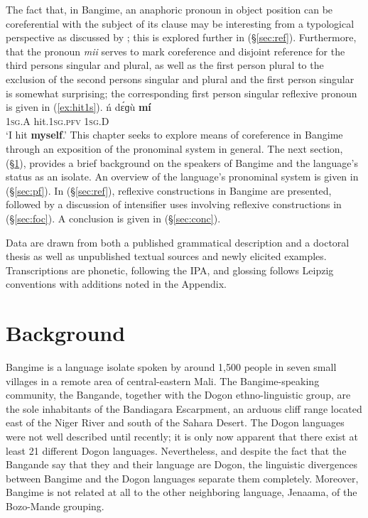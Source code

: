 \documentclass[output=paper]{langscibook}
\begin{document}
The fact that, in Bangime, an anaphoric pronoun in object position can be coreferential with the subject of its clause may be interesting from a typological perspective as discussed by \cite[4]{Haspelmath2019}; this is explored further in (\S \ref{sec:ref}). Furthermore, that the pronoun \textit{mii} serves to mark coreference and disjoint reference for the third persons singular and plural, as well as the first person plural to the exclusion of the second persons singular and plural and the first person singular is somewhat surprising; the corresponding first person singular reflexive pronoun is given in (\ref{ex:hit1s}).
\ea \label{ex:hit1s}
\gll 
ń dɛ́ɡù \textbf{mí} \\
1\textsc{sg}.A hit.1\textsc{sg}.\textsc{pfv} 1\textsc{sg}.D \\
\glt `I hit \textbf{myself}.' \citep[438]{HantganHeath2018}
\z
This chapter seeks to explore means of coreference in Bangime through an exposition of the pronominal system in general. The next section, (\S \ref{sec:back}), provides a brief background on the speakers of Bangime and the language's status as an isolate. An overview of the language's pronominal system is given in (\S \ref{sec:pf}). In (\S \ref{sec:ref}), reflexive constructions in Bangime are presented, followed by a discussion of intensifier uses involving reflexive constructions in (\S \ref{sec:foc}). A conclusion is given in (\S \ref{sec:conc}).

Data are drawn from both a published grammatical description and a doctoral thesis as well as unpublished textual sources and newly elicited examples. Transcriptions are phonetic, following the IPA, and glossing follows Leipzig conventions with additions noted in the Appendix.

\section{Background}
\label{sec:back}
Bangime is a language isolate spoken by around 1,500 people in seven small villages in a remote area of central-eastern Mali. The Bangime-speaking community, the Bangande, together with the Dogon ethno-linguistic group, are the sole inhabitants of the Bandiagara Escarpment, an arduous cliff range located east of the Niger River and south of the Sahara Desert. The Dogon languages were not well described until recently; it is only now apparent that there exist at least 21 different Dogon languages. Nevertheless, and despite the fact that the Bangande say that they and their language are Dogon, the linguistic divergences between Bangime and the Dogon languages separate them completely. Moreover, Bangime is not related at all to the other neighboring language, Jenaama, of the Bozo-Mande grouping.
\end{document}
